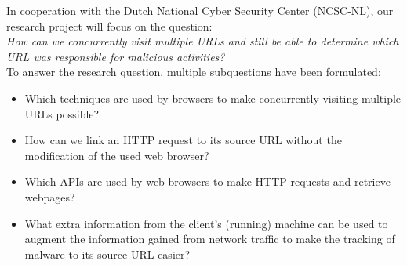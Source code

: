 In cooperation with the Dutch National Cyber Security Center (NCSC-NL), our research project will focus on the question:\\

\textit{How can we concurrently visit multiple URLs and still be able to determine which URL was responsible for malicious activities?}\\
\newpage
To answer the research question, multiple subquestions have been formulated:
\begin{itemize}
\item Which techniques are used by browsers to make concurrently visiting multiple URLs possible?
\item How can we link an HTTP request to its source URL without the modification of the used web browser?
\item Which APIs are used by web browsers to make HTTP requests and retrieve webpages?
\item What extra information from the client's (running) machine can be used to augment the information gained from network traffic to make the tracking of malware to its source URL easier?
\end{itemize}


